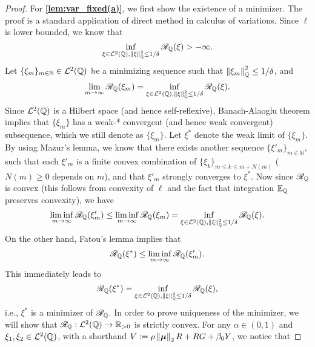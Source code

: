 \begin{proof}
    For \textbf{\ref{lem:var_fixed(a)}}, we first show the existence of a minimizer. The proof is a standard application of direct method in calculus of variations. Since $\ell$ is lower bounded, we know that
        \begin{equation*}
            \inf_{\xi \in \mathcal{L}^2(\mathbb{Q}), \left\|{\xi}\right\|_{\mathbb{Q}}^2 \le 1/\delta} \mathscr{R}_{\mathbb{Q}}(\xi) > - \infty.
        \end{equation*}
        Let $\{ \xi_m \}_{m \in \mathbb{N}} \in \mathcal{L}^2 (\mathbb{Q})$ be a minimizing sequence such that $\left\|{\xi_m}\right\|_{\mathbb{Q}}^2 \le 1/\delta$, and
        \begin{equation*}
            \lim_{m \to \infty} \mathscr{R}_{\mathbb{Q}}(\xi_m) = \inf_{\xi \in \mathcal{L}^2(\mathbb{Q}), \left\|{\xi}\right\|_{\mathbb{Q}}^2 \le 1/\delta} \mathscr{R}_{\mathbb{Q}}(\xi).
        \end{equation*}
        Since $\mathcal{L}^2 (\mathbb{Q})$ is a Hilbert space (and hence self-reflexive), Banach-Alaoglu theorem implies that $\{ \xi_m \}$ has a weak-* convergent (and hence weak convergent) subsequence, which we still denote as $\{ \xi_m \}$. Let $\xi^*$ denote the weak limit of $\{ \xi_m \}$. By using Mazur's lemma, we know that there exists another sequence $\{ \xi'_m \}_{m \in \mathbb{N}}$, such that each $\xi'_m$ is a finite convex combination of $\{ \xi_k \}_{m \le k \le m + N(m)}$ ($N(m) \ge 0$ depends on $m$), and that $\xi'_m$ strongly converges to $\xi^*$. Now since $\mathscr{R}_{\mathbb{Q}}$ is convex (this follows from convexity of $\ell$ and the fact that integration $\mathbb{E}_{\mathbb{Q}}$ preserves convexity), we have
        \begin{equation*}
            \liminf_{m \to \infty} \mathscr{R}_{\mathbb{Q}} (\xi'_m) \le \liminf_{m \to \infty} \mathscr{R}_{\mathbb{Q}} (\xi_m) = \inf_{\xi \in \mathcal{L}^2(\mathbb{Q}), \left\|{\xi}\right\|_{\mathbb{Q}}^2 \le 1/\delta} \mathscr{R}_{\mathbb{Q}}(\xi).
        \end{equation*}
        On the other hand, Fatou's lemma implies that
        \begin{equation*}
            \mathscr{R}_{\mathbb{Q}}(\xi^*) \le \liminf_{m \to \infty} \mathscr{R}_{\mathbb{Q}}(\xi'_m).
        \end{equation*}
        This immediately leads to
        \begin{equation*}
            \mathscr{R}_{\mathbb{Q}}(\xi^*) = \inf_{\xi \in \mathcal{L}^2(\mathbb{Q}), \left\|{\xi}\right\|_{\mathbb{Q}}^2 \le 1/\delta} \mathscr{R}_{\mathbb{Q}}(\xi),
        \end{equation*}
        i.e., $\xi^*$ is a minimizer of $\mathscr{R}_{\mathbb{Q}}$.
        In order to prove uniqueness of the minimizer, we will show that $\mathscr{R}_{\mathbb{Q}} : \mathcal{L}^2(\mathbb{Q}) \to \mathbb{R}_{> 0}$ is strictly convex. For any $\alpha \in (0, 1)$ and $\xi_1, \xi_2 \in \mathcal{L}^2(\mathbb{Q})$, with a shorthand $V := \rho\left\|{{\boldsymbol{\mu}}}\right\|_2 R + RG + \beta_0 Y$, we notice that

\end{proof}
